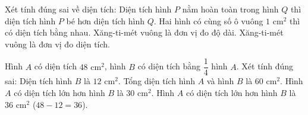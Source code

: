 \begin{ex} %
Xét tính đúng sai về diện tích:
\choiceTF
{\True Diện tích hình $P$ nằm hoàn toàn trong hình $Q$ thì diện tích hình $P$ bé hơn diện tích hình $Q$.}
{\True Hai hình có cùng số ô vuông $1\text{ cm}^2$ thì có diện tích bằng nhau.}
{Xăng-ti-mét vuông là đơn vị đo độ dài.}
{\True Xăng-ti-mét vuông là đơn vị đo diện tích.}
\end{ex}

\begin{ex} %
Hình $A$ có diện tích $48\text{ cm}^2$, hình $B$ có diện tích bằng $\dfrac{1}{4}$ hình $A$. Xét tính đúng sai:
\choiceTF
{\True Diện tích hình $B$ là $12\text{ cm}^2$.}
{\True Tổng diện tích hình $A$ và hình $B$ là $60\text{ cm}^2$.}
{Hình $A$ có diện tích lớn hơn hình $B$ là $30\text{ cm}^2$.}
{\True Hình $A$ có diện tích lớn hơn hình $B$ là $36\text{ cm}^2$ ($48 - 12 = 36$).}
\end{ex}

